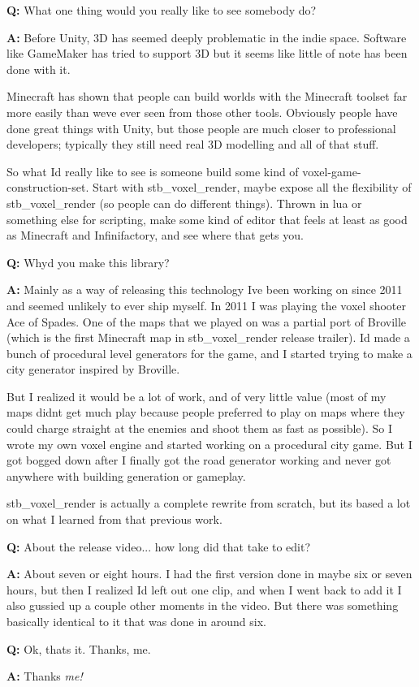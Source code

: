 {\bfseries{Q\+:}} What one thing would you really like to see somebody do?

{\bfseries{A\+:}} Before Unity, 3D has seemed deeply problematic in the indie space. Software like Game\+Maker has tried to support 3D but it seems like little of note has been done with it.

Minecraft has shown that people can build worlds with the Minecraft toolset far more easily than we\textquotesingle{}ve ever seen from those other tools. Obviously people have done great things with Unity, but those people are much closer to professional developers; typically they still need real 3D modelling and all of that stuff.

So what I\textquotesingle{}d really like to see is someone build some kind of voxel-\/game-\/construction-\/set. Start with stb\+\_\+voxel\+\_\+render, maybe expose all the flexibility of stb\+\_\+voxel\+\_\+render (so people can do different things). Thrown in lua or something else for scripting, make some kind of editor that feels at least as good as Minecraft and Infinifactory, and see where that gets you.

{\bfseries{Q\+:}} Why\textquotesingle{}d you make this library?

{\bfseries{A\+:}} Mainly as a way of releasing this technology I\textquotesingle{}ve been working on since 2011 and seemed unlikely to ever ship myself. In 2011 I was playing the voxel shooter Ace of Spades. One of the maps that we played on was a partial port of Broville (which is the first Minecraft map in stb\+\_\+voxel\+\_\+render release trailer). I\textquotesingle{}d made a bunch of procedural level generators for the game, and I started trying to make a city generator inspired by Broville.

But I realized it would be a lot of work, and of very little value (most of my maps didn\textquotesingle{}t get much play because people preferred to play on maps where they could charge straight at the enemies and shoot them as fast as possible). So I wrote my own voxel engine and started working on a procedural city game. But I got bogged down after I finally got the road generator working and never got anywhere with building generation or gameplay.

stb\+\_\+voxel\+\_\+render is actually a complete rewrite from scratch, but it\textquotesingle{}s based a lot on what I learned from that previous work.

{\bfseries{Q\+:}} About the release video... how long did that take to edit?

{\bfseries{A\+:}} About seven or eight hours. I had the first version done in maybe six or seven hours, but then I realized I\textquotesingle{}d left out one clip, and when I went back to add it I also gussied up a couple other moments in the video. But there was something basically identical to it that was done in around six.

{\bfseries{Q\+:}} Ok, that\textquotesingle{}s it. Thanks, me.

{\bfseries{A\+:}} Thanks {\itshape me!} 